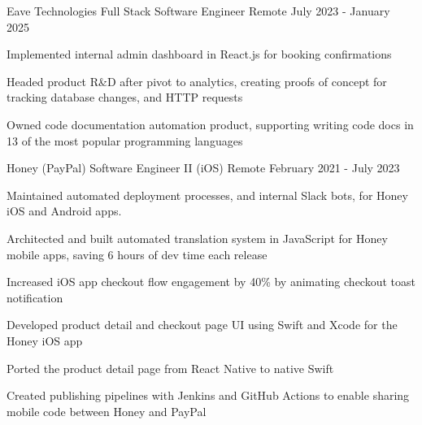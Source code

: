 \documentclass[11pt, a4paper]{awesome-cv}
\begin{document}
\makecvheader


\begin{cventries}


  \cventry
    {Eave Technologies}
    {Full Stack Software Engineer}
    {Remote}
    {July 2023 - January 2025}
    {
      \begin{cvitems}
        \item{Implemented internal admin dashboard in React.js for booking confirmations}
        \item{Headed product R\&D after pivot to analytics, creating proofs of concept for tracking database changes, and HTTP requests}
        \item{Owned code documentation automation product, supporting writing code docs in 13 of the most popular programming languages}
      \end{cvitems}
    }

  \cventry
    {Honey (PayPal)}
    {Software Engineer II (iOS)}
    {Remote}
    {February 2021 - July 2023}
    {
        \begin{cvitems}
            \item {Maintained automated deployment processes, and internal Slack bots, for Honey iOS and Android apps.}
            \item {Architected and built automated translation system in JavaScript for Honey mobile apps, saving 6 hours of dev time each release}
            \item {Increased iOS app checkout flow engagement by 40\% by animating checkout toast notification}
            \item {Developed product detail and checkout page UI using Swift and Xcode for the Honey iOS app}
            \item {Ported the product detail page from React Native to native Swift}
            \item {Created publishing pipelines with Jenkins and GitHub Actions to enable sharing mobile code between Honey and PayPal}
        \end{cvitems}
    }


\end{cventries}
\end{document}
